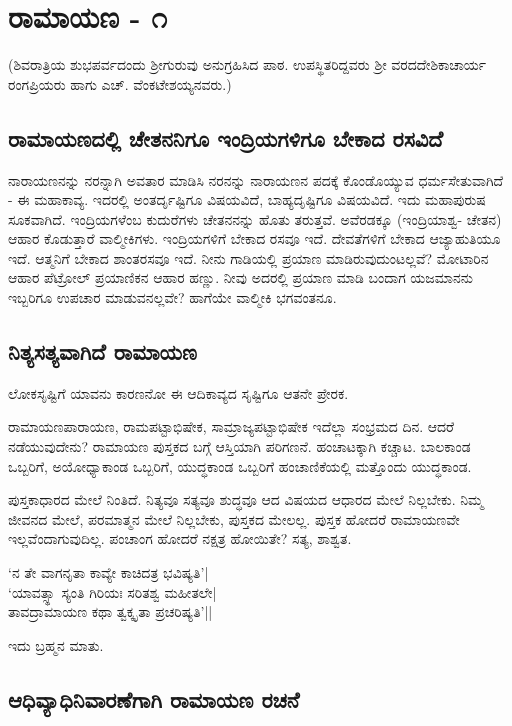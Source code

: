 \chapter{ರಾಮಾಯಣ - ೧}

(ಶಿವರಾತ್ರಿಯ ಶುಭಪರ್ವದಂದು ಶ್ರೀಗುರುವು ಅನುಗ್ರಹಿಸಿದ ಪಾಠ. ಉಪಸ್ಥಿತರಿದ್ದವರು ಶ್ರೀ ವರದದೇಶಿಕಾಚಾರ್ಯ ರಂಗಪ್ರಿಯರು ಹಾಗು ಎಚ್. ವೆಂಕಟೇಶಯ್ಯನವರು.)

\section*{ರಾಮಾಯಣದಲ್ಲಿ  ಚೇತನನಿಗೂ ಇಂದ್ರಿಯಗಳಿಗೂ ಬೇಕಾದ ರಸವಿದೆ}

ನಾರಾಯಣನನ್ನು ನರನ್ನಾಗಿ ಅವತಾರ ಮಾಡಿಸಿ ನರನನ್ನು  ನಾರಾಯಣನ ಪದಕ್ಕೆ ಕೊಂಡೊಯ್ಯುವ ಧರ್ಮಸೇತುವಾಗಿದೆ  - ಈ ಮಹಾಕಾವ್ಯ. ಇದರಲ್ಲಿ ಅಂತರ್ದೃಷ್ಟಿಗೂ ವಿಷಯವಿದೆ, ಬಾಹ್ಯದೃಷ್ಟಿಗೂ ವಿಷಯವಿದೆ. ಇದು ಮಹಾಪುರುಷ ಸೂಕವಾಗಿದೆ. ಇಂದ್ರಿಯಗಳೆಂಬ ಕುದುರೆಗಳು ಚೇತನನನ್ನು ಹೊತು ತರುತ್ತವೆ. ಅವೆರಡಕ್ಕೂ (ಇಂದ್ರಿಯಾಶ್ವ- ಚೇತನ) ಆಹಾರ ಕೊಡುತ್ತಾರೆ ವಾಲ್ಮೀಕಿಗಳು. ಇಂದ್ರಿಯಗಳಿಗೆ ಬೇಕಾದ ರಸವೂ ಇದೆ. ದೇವತೆಗಳಿಗೆ ಬೇಕಾದ ಆಜ್ಯಾಹುತಿಯೂ ಇದೆ. ಆತ್ಮನಿಗೆ ಬೇಕಾದ ಶಾಂತರಸವೂ ಇದೆ. ನೀನು ಗಾಡಿಯಲ್ಲಿ ಪ್ರಯಾಣ ಮಾಡಿರುವುದುಂಟಲ್ಲವೆ? ಮೋಟಾರಿನ ಆಹಾರ ಪೆಟ್ರೋಲ್ ಪ್ರಯಾಣಿಕನ ಆಹಾರ ಹಣ್ಣು. ನೀವು ಅದರಲ್ಲಿ ಪ್ರಯಾಣ ಮಾಡಿ ಬಂದಾಗ  ಯಜಮಾನನು ಇಬ್ಬರಿಗೂ ಉಪಚಾರ ಮಾಡುವನಲ್ಲವೇ? ಹಾಗೆಯೇ ವಾಲ್ಮೀಕಿ ಭಗವಂತನೂ. 

\section*{ನಿತ್ಯಸತ್ಯವಾಗಿದೆ ರಾಮಾಯಣ}

ಲೋಕಸೃಷ್ಟಿಗೆ ಯಾವನು ಕಾರಣನೋ ಈ ಆದಿಕಾವ್ಯದ ಸೃಷ್ಟಿಗೂ ಆತನೇ ಪ್ರೇರಕ.

ರಾಮಾಯಣಪಾರಾಯಣ, ರಾಮಪಟ್ಟಾಭಿಷೇಕ, ಸಾಮ್ರಾಜ್ಯಪಟ್ಟಾಭಿಷೇಕ ಇದೆಲ್ಲಾ ಸಂಭ್ರಮದ ದಿನ. ಆದರೆ ನಡೆಯುವುದೇನು? ರಾಮಾಯಣ ಪುಸ್ತಕದ ಬಗ್ಗೆ ಆಸ್ತಿಯಾಗಿ ಪರಿಗಣನೆ. ಹಂಚಾಟಕ್ಕಾಗಿ ಕಚ್ಚಾಟ. ಬಾಲಕಾಂಡ ಒಬ್ಬರಿಗೆ, ಅಯೋಧ್ಯಾಕಾಂಡ ಒಬ್ಬರಿಗೆ, ಯುದ್ಧಕಾಂಡ ಒಬ್ಬರಿಗೆ ಹಂಚಾಣಿಕೆಯಲ್ಲಿ ಮತ್ತೊಂದು ಯುದ್ಧಕಾಂಡ. 

ಪುಸ್ತಕಾಧಾರದ ಮೇಲೆ ನಿಂತಿದೆ. ನಿತ್ಯವೂ ಸತ್ಯವೂ ಶುದ್ಧವೂ ಆದ ವಿಷಯದ ಆಧಾರದ ಮೇಲೆ ನಿಲ್ಲಬೇಕು. ನಿಮ್ಮ ಜೀವನದ ಮೇಲೆ, ಪರಮಾತ್ಮನ ಮೇಲೆ ನಿಲ್ಲಬೇಕು, ಪುಸ್ತಕದ ಮೇಲಲ್ಲ. ಪುಸ್ತಕ ಹೋದರೆ ರಾಮಾಯಣವೇ ಇಲ್ಲವೆಂದಾಗುವುದಿಲ್ಲ. ಪಂಚಾಂಗ ಹೋದರೆ ನಕ್ಷತ್ರ ಹೋಯಿತೇ? ಸತ್ಯ, ಶಾಶ್ವತ. 

\begin{shloka}
`ನ ತೇ ವಾಗನೃತಾ ಕಾವ್ಯೇ ಕಾಚಿದತ್ರ ಭವಿಷ್ಯತಿ'|\label{209}\\
`ಯಾವತ್ಸ್ಥಾ ಸ್ಯಂತಿ ಗಿರಿಯಃ ಸರಿತಶ್ವ ಮಹೀತಲೇ|\\
ತಾವದ್ರಾಮಾಯಣ ಕಥಾ ತ್ವಕ್ಕೃತಾ ಪ್ರಚರಿಷ್ಯತಿ'||
\end{shloka}

ಇದು ಬ್ರಹ್ಮನ ಮಾತು.

\section*{ಆಧಿವ್ಯಾಧಿನಿವಾರಣೆಗಾಗಿ ರಾಮಾಯಣ ರಚನೆ}

